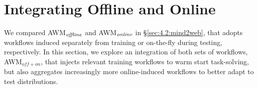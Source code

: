 \section{Integrating \awm Offline and Online}
\label{app:mind2web-offline-online}

We compared \textsc{AWM}$_{\it offline}$ and \textsc{AWM}$_{\it online}$ in \S\ref{sec:4.2:mind2web}, that adopts workflows induced separately from training or on-the-fly during testing, respectively. In this section, we explore an integration of both sets of workflows, \textsc{AWM$_\mathit{off+on}$}, that injects relevant training workflows to warm start task-solving, but also aggregates increasingly more online-induced workflows to better adapt to test distributions.


\begin{table}[ht]
\vspace{-2mm}
\small
\centering
\caption{Success rate on Mind2Web cross-task, cross-website, and cross-domain generalization test, using \texttt{gpt-4} model. EA is short for element accuracy and AF$_1$ is short for action F$_1$.}
\vspace{1mm}
\label{tab:mind2web-offline-online}
\end{table}

